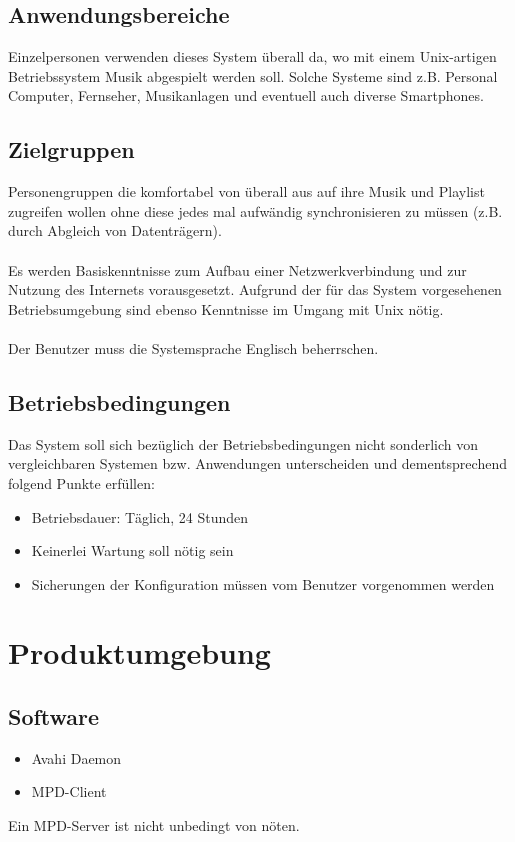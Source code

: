 \subsection{Anwendungsbereiche}
Einzelpersonen verwenden dieses System überall da, wo mit 
einem Unix-artigen Betriebssystem Musik abgespielt werden soll.
Solche Systeme sind z.B. Personal Computer, Fernseher, Musikanlagen
und eventuell auch diverse Smartphones.
\subsection{Zielgruppen}
Personengruppen die komfortabel von überall aus auf ihre Musik und Playlist zugreifen
wollen ohne diese jedes mal aufwändig synchronisieren zu müssen (z.B. durch Abgleich von Datenträgern).\ \\ \\
Es werden Basiskenntnisse zum Aufbau einer Netzwerkverbindung und zur Nutzung des Internets vorausgesetzt.
Aufgrund der für das System vorgesehenen Betriebsumgebung sind ebenso Kenntnisse im Umgang mit Unix nötig.\ \\ \\
Der Benutzer muss die Systemsprache Englisch beherrschen.
\subsection{Betriebsbedingungen}
Das System soll sich bezüglich der Betriebsbedingungen nicht sonderlich von vergleichbaren Systemen bzw.
Anwendungen unterscheiden und dementsprechend folgend Punkte erfüllen:
\begin{itemize}
	\item Betriebsdauer: Täglich, 24 Stunden
	\item Keinerlei Wartung soll nötig sein
	\item Sicherungen der Konfiguration müssen vom Benutzer vorgenommen werden
\end{itemize}
\section{Produktumgebung}
\subsection{Software}
\begin{itemize}
	\item Avahi Daemon
	\item MPD-Client
\end{itemize}
Ein MPD-Server ist nicht unbedingt von nöten.
